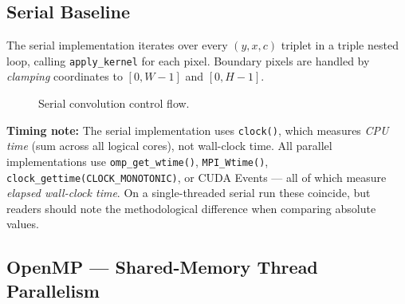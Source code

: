 \documentclass[12pt,a4paper]{article}
\begin{document}
\subsection{Serial Baseline}

The serial implementation iterates over every $(y, x, c)$ triplet in a triple
nested loop, calling \texttt{apply\_kernel} for each pixel. Boundary pixels are
handled by \emph{clamping} coordinates to $[0,W{-}1]$ and $[0,H{-}1]$.

\begin{figure}[H]
\centering
{}
\caption{Serial convolution control flow.}
\label{fig:serial-flow}
\end{figure}

\begin{notebox}
\textbf{Timing note:} The serial implementation uses \texttt{clock()}, which
measures \emph{CPU time} (sum across all logical cores), not wall-clock time.
All parallel implementations use \texttt{omp\_get\_wtime()},
\texttt{MPI\_Wtime()}, \texttt{clock\_gettime(CLOCK\_MONOTONIC)}, or CUDA
Events --- all of which measure \emph{elapsed wall-clock time}. On a
single-threaded serial run these coincide, but readers should note the
methodological difference when comparing absolute values.
\end{notebox}

\subsection{OpenMP --- Shared-Memory Thread Parallelism}
\end{document}
